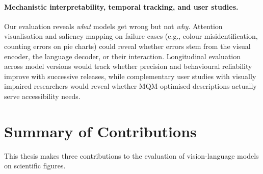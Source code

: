 \paragraph{Mechanistic interpretability, temporal tracking, and user studies.}
Our evaluation reveals \emph{what} models get wrong but not \emph{why}.
Attention visualisation and saliency mapping on failure cases (e.g., colour misidentification, counting errors on pie charts) could reveal whether errors stem from the visual encoder, the language decoder, or their interaction.
Longitudinal evaluation across model versions would track whether precision and behavioural reliability improve with successive releases, while complementary user studies with visually impaired researchers would reveal whether MQM-optimised descriptions actually serve accessibility needs.

\section{Summary of Contributions}\label{sec:contributions}

This thesis makes three contributions to the evaluation of vision-language models on scientific figures.

